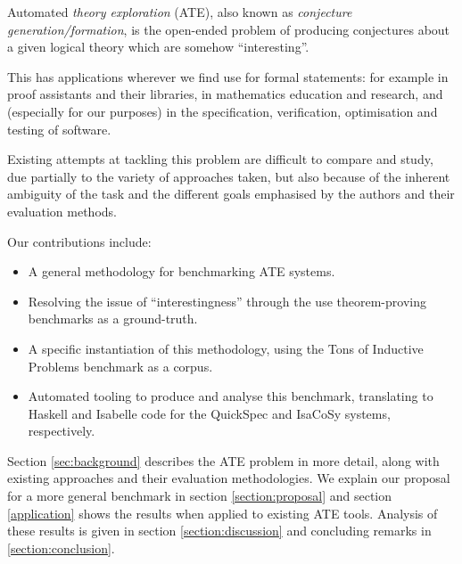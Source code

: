 
Automated \emph{theory exploration} (ATE), also known as
\emph{conjecture generation/formation}, is the open-ended problem of producing
conjectures about a given logical theory which are somehow ``interesting''.

This has applications wherever we find use for formal statements: for example in
proof assistants and their libraries, in mathematics education and research, and
(especially for our purposes) in the specification, verification, optimisation
and testing of software.

Existing attempts at tackling this problem are difficult to compare and study,
due partially to the variety of approaches taken, but also because of the
inherent ambiguity of the task and the different goals emphasised by the authors
and their evaluation methods.

Our contributions include:

\begin{itemize}
\item A general methodology for benchmarking ATE systems.
\item Resolving the issue of ``interestingness'' through the use theorem-proving
  benchmarks as a ground-truth.
\item A specific instantiation of this methodology, using the Tons of Inductive
  Problems benchmark as a corpus.
\item Automated tooling to produce and analyse this benchmark, translating to
  Haskell and Isabelle code for the QuickSpec and IsaCoSy systems, respectively.
\end{itemize}

Section \ref{sec:background} describes the ATE problem in more detail, along
with existing approaches and their evaluation methodologies. We explain our
proposal for a more general benchmark in section \ref{section:proposal} and
section \ref{application} shows the results when applied to existing ATE tools.
Analysis of these results is given in section \ref{section:discussion} and
concluding remarks in \ref{section:conclusion}.



